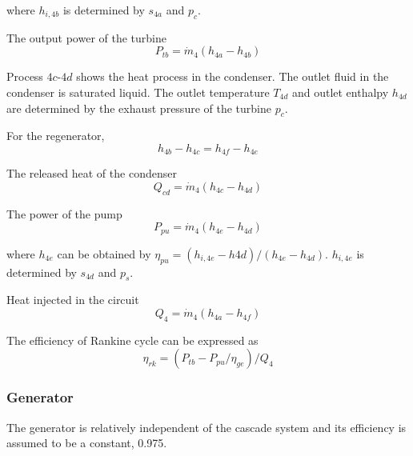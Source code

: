 where $h_{i,4b}$ is determined by $s_{4a}$ and $p_c$.

The output power of the turbine
\begin{equation}
  P_{tb}=\dot{m}_{4}(h_{4a}-h_{4b})
\end{equation}

Process $4c$-$4d$ shows the heat process in the condenser. The outlet fluid in the condenser is saturated liquid. The outlet temperature $T_{4d}$ and outlet enthalpy $h_{4d}$ are determined by the exhaust pressure of the turbine $p_c$.

  For the regenerator,
  \begin{equation}
      h_{4b} - h_{4c} = h_{4f} - h_{4e}
  \end{equation}
  
  The released heat of the condenser
  \begin{equation}
      Q_{cd} = \dot{m}_4 (h_{4c} - h_{4d})
\end{equation}

    The power of the pump
  \begin{equation}
	P_{pu}=\dot{m}_{4}(h_{4e}-h_{4d})
\end{equation}
    
    where $h_{4e}$ can be obtained by $\eta_{pu} = (h_{i,4e}-h{4d})/(h_{4e}-h_{4d})$. $h_{i,4e}$ is determined by $s_{4d}$ and $p_s$.
    
  Heat injected in the circuit
\begin{equation}
	    Q_4=\dot{m}_4(h_{4a}-h_{4f})
    \end{equation}

The efficiency of Rankine cycle can be expressed as
\begin{equation}
	\eta_{rk}=(P_{tb}-P_{pu}/\eta_{ge})/Q_{4}
\end{equation}




\subsubsection{Generator}
The generator is relatively independent of the cascade system and its efficiency is assumed to be a constant, 0.975.

